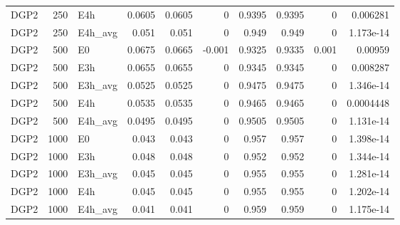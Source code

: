 \begin{table}[!htbp]
{\begin{tabular}{lrlrrrrrrr}
DGP2 & 250 & E4h & 0.0605 & 0.0605 & 0 & 0.9395 & 0.9395 & 0 & 0.006281 \\
DGP2 & 250 & E4h_avg & 0.051 & 0.051 & 0 & 0.949 & 0.949 & 0 & 1.173e-14 \\
DGP2 & 500 & E0 & 0.0675 & 0.0665 & -0.001 & 0.9325 & 0.9335 & 0.001 & 0.00959 \\
DGP2 & 500 & E3h & 0.0655 & 0.0655 & 0 & 0.9345 & 0.9345 & 0 & 0.008287 \\
DGP2 & 500 & E3h_avg & 0.0525 & 0.0525 & 0 & 0.9475 & 0.9475 & 0 & 1.346e-14 \\
DGP2 & 500 & E4h & 0.0535 & 0.0535 & 0 & 0.9465 & 0.9465 & 0 & 0.0004448 \\
DGP2 & 500 & E4h_avg & 0.0495 & 0.0495 & 0 & 0.9505 & 0.9505 & 0 & 1.131e-14 \\
DGP2 & 1000 & E0 & 0.043 & 0.043 & 0 & 0.957 & 0.957 & 0 & 1.398e-14 \\
DGP2 & 1000 & E3h & 0.048 & 0.048 & 0 & 0.952 & 0.952 & 0 & 1.344e-14 \\
DGP2 & 1000 & E3h_avg & 0.045 & 0.045 & 0 & 0.955 & 0.955 & 0 & 1.281e-14 \\
DGP2 & 1000 & E4h & 0.045 & 0.045 & 0 & 0.955 & 0.955 & 0 & 1.202e-14 \\
DGP2 & 1000 & E4h_avg & 0.041 & 0.041 & 0 & 0.959 & 0.959 & 0 & 1.175e-14 \\
\bottomrule
\end{tabular}}

\end{table}
